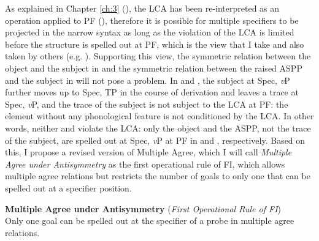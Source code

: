 As explained in Chapter \ref{ch:3} (), the \ac{LCA} has been re-interpreted as an operation applied to \ac{PF} (\citealt{Chomsky1995,Moro2000}), therefore it is possible for multiple specifiers to be projected in the narrow syntax as long as the violation of the \ac{LCA} is limited before the structure is spelled out at PF, which is the view that I take and also taken by others (e.g. \citealt{Nagai2010,Ochi2009}). Supporting this view, the symmetric relation between the object and the subject in  and the symmetric relation between the raised \ac{ASP}P and the subject in  will not pose a problem. In  and , the subject at Spec, \textit{v}P further moves up to Spec, \ac{TP} in the course of derivation and leaves a trace at Spec, \textit{v}P, and the trace of the subject is not subject to the \ac{LCA} at \ac{PF}: the element without any phonological feature is not conditioned by the \ac{LCA}. In other words, neither  and  violate the \ac{LCA}: only the object and the \ac{ASP}P, not the trace of the subject, are spelled out at Spec, \textit{v}P at \ac{PF} in and , respectively. Based on this, I propose a revised version of Multiple Agree, which I will call \textit{Multiple Agree under Antisymmetry}  as the first operational rule of \ac{FI}, which allows multiple agree relations but restricts the number of goals to only one that can be spelled out at a specifier position.

\ea\label{ex:83} \textbf{Multiple Agree under Antisymmetry} (\textit{First Operational Rule of \ac{FI}}) \\
Only one goal can be spelled out at the specifier of a probe in multiple agree relations.
\z

